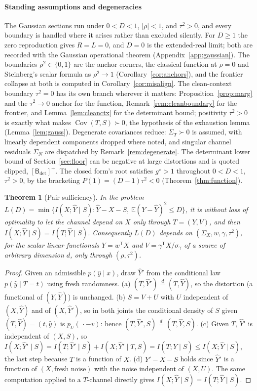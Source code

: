 ﻿\documentclass[11pt,onecolumn]{IEEEtran}
\newtheorem{theorem}{Theorem}
\newcommand{\E}{\mathbb{E}}
\newcommand{\Cov}{\operatorname{Cov}}
\newcommand{\hY}{\widehat{Y}}
\newcommand{\Bdet}{\mathsf{B}_{\det}}
\begin{document}
\paragraph*{Standing assumptions and degeneracies}
The Gaussian sections run under $0<D<1$, $|\rho|<1$, and $\tau^2>0$, and
every boundary is handled where it arises rather than excluded silently.
For $D\ge1$ the zero reproduction gives $R=L=0$, and $D=0$ is the
extended-real limit; both are recorded with the Gaussian operational
theorem (Appendix~\ref{app:gaussian}). The boundaries $\rho^2\in\{0,1\}$
are the anchor corners, the classical function at $\rho=0$ and
Steinberg's scalar formula as $\rho^2\to1$
(Corollary~\ref{cor:anchors}), and the frontier collapse at both is
computed in Corollary~\ref{cor:misalign}. The clean-context boundary
$\tau^2=0$ has its own branch wherever it matters:
Proposition~\ref{prop:marg} and the $\tau^2\to0$ anchor for the
function, Remark~\ref{rem:cleanboundary} for the frontier, and
Lemma~\ref{lem:cleanctx} for the determinant bound; positivity
$\tau^2>0$ is exactly what makes $\Cov(T,S)\succ0$, the hypothesis of
the exhaustion lemma (Lemma~\ref{lem:gauss}). Degenerate covariances
reduce: $\Sigma_T\succ0$ is assumed, with linearly dependent components
dropped where noted, and singular channel residuals $\Sigma_N$ are
dispatched by Remark~\ref{rem:degenerate}. The determinant lower bound
of Section~\ref{sec:floor} can be negative at large distortions and is
quoted clipped, $[\Bdet]^{+}$. The closed form's root satisfies
$g^\star>1$ throughout $0<D<1$, $\tau^2>0$, by the bracketing
$P(1)=(D-1)\tau^2<0$ (Theorem~\ref{thm:function}).

\begin{theorem}[Pair sufficiency]\label{thm:pair}
In the problem
$L(D)=\min\{I(X;\hY\mid S):\hY-X-S,\ \E(Y-\hY)^2\le D\}$, it is without
loss of optimality to let the channel depend on $X$ only through
$T=(Y,V)$, and then $I(X;\hY\mid S)=I(T;\hY\mid S)$. Consequently $L(D)$
depends on $(\Sigma_X,w,\gamma,\tau^2)$, for the scalar linear functionals
$Y=w^{\mathsf T}X$ and $V=\gamma^{\mathsf T}X/\sigma_\gamma$ of a source of
arbitrary dimension $d$, only through $(\rho,\tau^2)$.
\end{theorem}
\begin{proof}
Given an admissible $p(\hat y\mid x)$, draw $\hY'$ from the conditional
law $p(\hat y\mid T=t)$ using fresh randomness. (a) $(T,\hY')\overset{d}=
(T,\hY)$, so the distortion (a functional of $(Y,\hY)$) is unchanged.
(b) $S=V+U$ with $U$ independent of $(X,\hY)$ and of $(X,\hY')$, so in
both joints the conditional density of $S$ given $(T,\hY)=(t,\hat y)$
is $p_U(\,\cdot-v)$: hence
$(T,\hY',S)\overset{d}=(T,\hY,S)$. (c) Given $T$, $\hY'$ is independent
of $(X,S)$, so $I(X;\hY'\mid S)=I(T;\hY'\mid S)+I(X;\hY'\mid T,S)
=I(T;\hY\mid S)\le I(X;\hY\mid S)$, the last step because $T$ is a
function of $X$. (d) $\hY'-X-S$ holds since $\hY'$ is a function of
$(X,\text{fresh noise})$ with the noise independent of $(X,U)$. The same
computation applied to a $T$-channel directly gives
$I(X;\hY\mid S)=I(T;\hY\mid S)$.
\end{proof}
\end{document}
